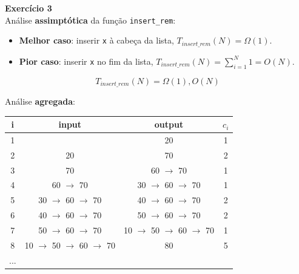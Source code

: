 \documentclass[a4paper,11pt]{article}
\begin{document}
	\noindent \textbf{Exercício 3}\\
	
	\noindent Análise \textbf{assimptótica} da função \texttt{insert\_rem}:
	\begin{itemize}
		\item \textbf{Melhor caso}: inserir \texttt{x} à cabeça da lista, $ T_{insert\_rem}(N) = \Omega(1) $.
		\item \textbf{Pior caso}: inserir \texttt{x} no fim da lista, $ T_{insert\_rem}(N) = \sum_{i=1}^{N} 1 = O(N) $.
	\end{itemize}
	\[
		T_{insert\_rem}(N) = \Omega(1), O(N)
	\]
	
	\noindent Análise \textbf{agregada}:
	
	\begin{center}
	\begin{tabular}{|c|c|c|c|}
		\hline
		i & input & output & $ c_i $ \\
		\hline
		\hline
		1 & & 20 & 1 \\
		2 & 20 & 70 & 2 \\
		3 & 70 & 60 $\rightarrow$ 70 & 1 \\
		4 & 60 $\rightarrow$ 70 & 30 $\rightarrow$ 60 $\rightarrow$ 70 & 1 \\
		5 & 30 $\rightarrow$ 60 $\rightarrow$ 70 & 40 $\rightarrow$ 60 $\rightarrow$ 70 & 2 \\
		6 & 40 $\rightarrow$ 60 $\rightarrow$ 70 & 50 $\rightarrow$ 60 $\rightarrow$ 70 & 2 \\
		7 & 50 $\rightarrow$ 60 $\rightarrow$ 70 & 10 $\rightarrow$ 50 $\rightarrow$ 60 $\rightarrow$ 70 & 1 \\
		8 & 10 $\rightarrow$ 50 $\rightarrow$ 60 $\rightarrow$ 70 & 80 & 5 \\
		... & & & \\
		\hline
	\end{tabular}
	\end{center}
	
	
	
	
	
	
	
\end{document}
